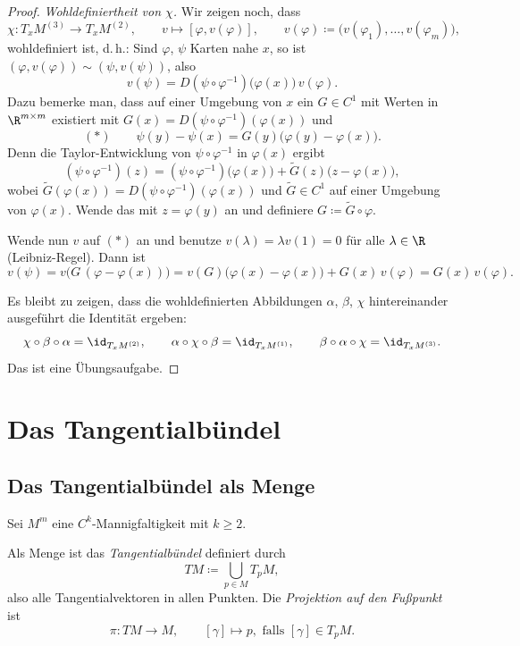 \documentclass[11pt]{article}
\begin{document}
\begin{proof}
  \textit{Wohldefiniertheit von $\chi$.} Wir zeigen noch, dass
  \[ \chi\colon T_x M^{(3)} \to T_x M^{(2)}, \qquad v \mapsto [\varphi, v(\varphi)], \qquad v(\varphi) \coloneqq \bigl(v(\varphi_1), \dots, v(\varphi_m)\bigr), \]
  wohldefiniert ist, d.\,h.: Sind $\varphi$, $\psi$ Karten nahe $x$, so ist $(\varphi, v(\varphi)) \sim (\psi, v(\psi))$, also
  \[ v(\psi) = D(\psi \circ \varphi^{-1})\bigl(\varphi(x)\bigr)\, v(\varphi). \]
Dazu bemerke man, dass auf einer Umgebung von $x$ ein $G \in C^1$ mit Werten in $\R^{m \times m}$ existiert mit $G(x) = D(\psi \circ \varphi^{-1})(\varphi(x))$ und
  \[ (\ast) \qquad \psi(y) - \psi(x) = G(y)\bigl(\varphi(y) - \varphi(x)\bigr). \]
  Denn die Taylor-Entwicklung von $\psi \circ \varphi^{-1}$ in $\varphi(x)$ ergibt
  \[ (\psi \circ \varphi^{-1})(z) = (\psi \circ \varphi^{-1})\bigl(\varphi(x)\bigr) + \tilde{G}(z)\bigl(z - \varphi(x)\bigr), \]
  wobei $\tilde{G}(\varphi(x)) = D(\psi \circ \varphi^{-1})(\varphi(x))$ und $\tilde{G} \in C^1$ auf einer Umgebung von $\varphi(x)$. Wende das mit $z = \varphi(y)$ an und definiere $G \coloneqq \tilde{G} \circ \varphi$.


  Wende nun $v$ auf $(\ast)$ an und benutze $v(\lambda) = \lambda v(1) = 0$ für alle $\lambda \in \R$ (Leibniz-Regel). Dann ist
  \[ v(\psi) = v\bigl(G\, (\varphi - \varphi(x))\bigr) = v(G)\bigl(\varphi(x) - \varphi(x)\bigr) + G(x)\, v(\varphi) = G(x)\, v(\varphi). \]


  Es bleibt zu zeigen, dass die wohldefinierten Abbildungen $\alpha$, $\beta$, $\chi$ hintereinander ausgeführt die Identität ergeben:
  \[ \chi \circ \beta \circ \alpha = \id_{T_x M^{(2)}}, \qquad \alpha \circ \chi \circ \beta = \id_{T_x M^{(1)}}, \qquad \beta \circ \alpha \circ \chi = \id_{T_x M^{(3)}}. \]
Das ist eine Übungsaufgabe.
\end{proof}


\section{Das Tangentialbündel}

\subsection{Das Tangentialbündel als Menge}

Sei $M^m$ eine $C^k$-Mannigfaltigkeit mit $k \ge 2$.

\begin{definition}[Tangentialbündel]\Theorem
  Als Menge ist das \emph{Tangentialbündel} definiert durch
  \[ TM \coloneqq \bigcup_{p \in M} T_p M, \]
  also \glqq alle Tangentialvektoren in allen Punkten\grqq. Die \emph{Projektion auf den Fußpunkt} ist
  \[ \pi \colon TM \longrightarrow M, \qquad [\gamma] \longmapsto p, \text{ falls } [\gamma] \in T_p M. \]
\end{definition}
\end{document}
